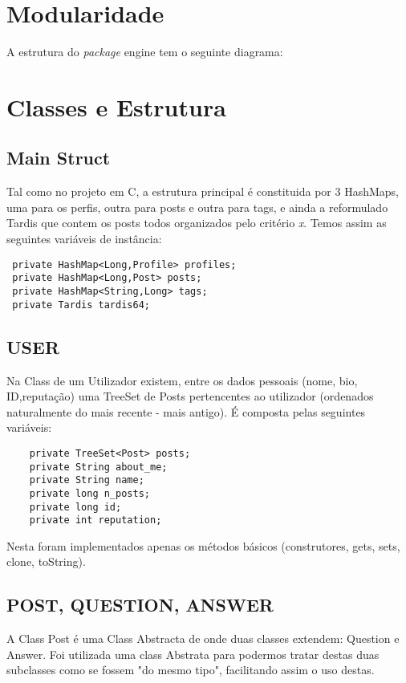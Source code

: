 \section{Modularidade}
A estrutura do \textit{package} engine tem o seguinte diagrama:

\section{Classes e Estrutura}

\subsection{Main Struct}
Tal como no projeto em C, a estrutura principal é constituida por 3 HashMaps, uma para os perfis, outra para posts e outra para tags, e ainda a reformulado Tardis que contem os posts todos organizados pelo critério \textit{x}.
\newline
Temos assim as seguintes variáveis de instância:
\begin{lstlisting}
 private HashMap<Long,Profile> profiles;
 private HashMap<Long,Post> posts;
 private HashMap<String,Long> tags;
 private Tardis tardis64;
 \end{lstlisting}

\subsection{USER}

 Na Class de um Utilizador existem, entre os dados pessoais (nome, bio, ID,reputação) uma TreeSet de Posts
 pertencentes ao utilizador (ordenados naturalmente do mais recente - mais antigo).
 É composta pelas seguintes variáveis:

 \begin{lstlisting}
    private TreeSet<Post> posts;
    private String about_me;
    private String name;
    private long n_posts;
    private long id;
    private int reputation;
 \end{lstlisting}

 Nesta foram implementados apenas os métodos básicos (construtores, gets, sets, clone, toString).

\subsection{POST, QUESTION, ANSWER}

 A Class Post é uma Class Abstracta de onde duas classes extendem: Question e Answer.
 Foi utilizada uma class Abstrata para podermos tratar destas duas subclasses como se fossem
 "do mesmo tipo", facilitando assim o uso destas.

